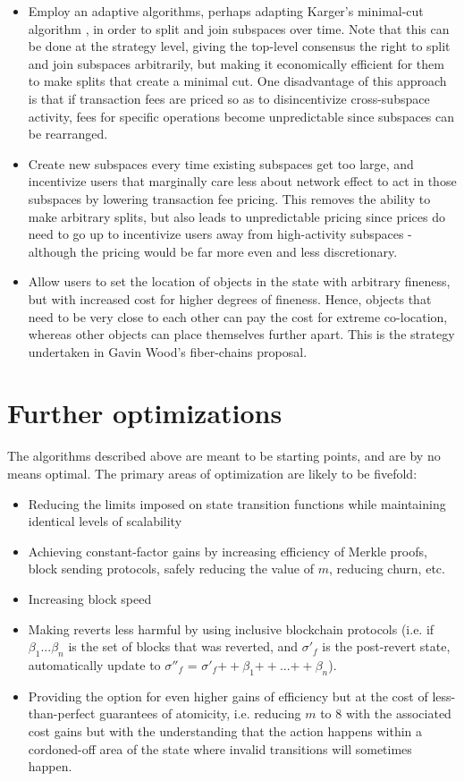 \documentclass[11pt,a4paper]{article}
\makeatletter
\theoremstyle{plain}
\theoremstyle{definition}
\theoremstyle{remark}
\newcommand{\ie}{i.e.\@\xspace}
\makeatother
\begin{document}
\begin{itemize}
\item
Employ an adaptive algorithms, perhaps adapting Karger's minimal-cut algorithm \cite{karger}, in order to split and join subspaces over time. Note that this can be done at the strategy level, giving the top-level consensus the right to split and join subspaces arbitrarily, but making it economically efficient for them to make splits that create a minimal cut. One disadvantage of this approach is that if transaction fees are priced so as to disincentivize cross-subspace activity, fees for specific operations become unpredictable since subspaces can be rearranged.
\item
Create new subspaces every time existing subspaces get too large, and incentivize users that marginally care less about network effect to act in those subspaces by lowering transaction fee pricing. This removes the ability to make arbitrary splits, but also leads to unpredictable pricing since prices do need to go up to incentivize users away from high-activity subspaces - although the pricing would be far more even and less discretionary.
\item
Allow users to set the location of objects in the state with arbitrary fineness, but with increased cost for higher degrees of fineness. Hence, objects that need to be very close to each other can pay the cost for extreme co-location, whereas other objects can place themselves further apart. This is the strategy undertaken in Gavin Wood's fiber-chains proposal\cite{fiberchains}.
\end{itemize}

\section{Further optimizations}

The algorithms described above are meant to be starting points, and are by no means optimal. The primary areas of optimization are likely to be fivefold:

\begin{itemize}
\item
Reducing the limits imposed on state transition functions while maintaining identical levels of scalability
\item
Achieving constant-factor gains by increasing efficiency of Merkle proofs, block sending protocols, safely reducing the value of $m$, reducing churn, etc.
\item
Increasing block speed
\item
Making reverts less harmful by using inclusive blockchain protocols (\ie if $\beta_1 ... \beta_n$ is the set of blocks that was reverted, and $\sigma'_f$ is the post-revert state, automatically update to $\sigma''_f$ = $\sigma'_f {++} \beta_1 {++} ... {++} \beta_n$).
\item
Providing the option for even higher gains of efficiency but at the cost of less-than-perfect guarantees of atomicity, \ie reducing $m$ to $8$ with the associated cost gains but with the understanding that the action happens within a cordoned-off area of the state where invalid transitions will sometimes happen.
\end{itemize}
\end{document}
